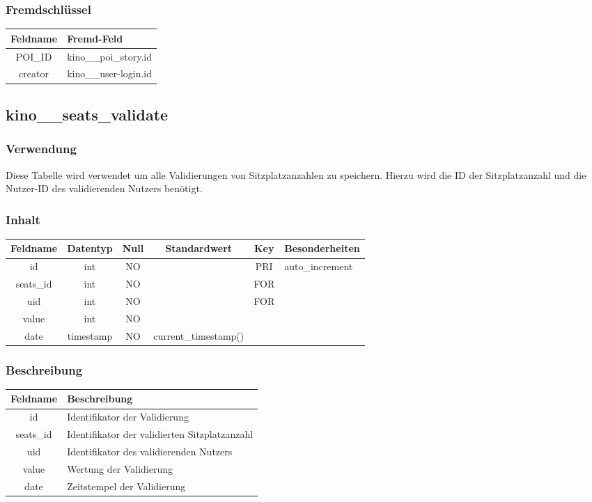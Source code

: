\subsubsection{Fremdschlüssel}
\begin{table}[H]
	\begin{tabular}{|c|p{12.5cm}|}
		\hline
		\textbf{Feldname} & \textbf{Fremd-Feld} \\ \hline
		POI\_ID & kino\_\_poi\_story.id \\ \hline
		creator & kino\_\_user-login.id \\ \hline
	\end{tabular}
\end{table}
\subsection{kino\_\_seats\_validate}
\subsubsection{Verwendung} Diese Tabelle wird verwendet um alle Validierungen von Sitzplatzanzahlen zu speichern. Hierzu wird die ID der Sitzplatzanzahl und die Nutzer-ID des validierenden Nutzers benötigt.
\subsubsection{Inhalt}
\begin{table}[H]
	\begin{tabular}{|c|c|c|c|c|p{3.5cm}|}
		\hline
		\textbf{Feldname} & \textbf{Datentyp} & \textbf{Null} & \textbf{Standardwert} & \textbf{Key}   & \textbf{Besonderheiten} \\ \hline
		id & int & NO &  & PRI & auto\_increment \\ \hline
		seats\_id & int & NO &  & FOR & \\ \hline
		uid & int & NO &  & FOR & \\ \hline
		value & int & NO &  &  & \\ \hline
		date & timestamp & NO & current\_timestamp() &  & \\ \hline
	\end{tabular}
\end{table}
\subsubsection{Beschreibung}
\begin{table}[H]
	\begin{tabular}{|c|p{12cm}|}
		\hline
		\textbf{Feldname} & \textbf{Beschreibung} \\ \hline
		id & Identifikator der Validierung \\ \hline
		seats\_id & Identifikator der validierten Sitzplatzanzahl \\ \hline
		uid & Identifikator des validierenden Nutzers \\ \hline
		value & Wertung der Validierung \\ \hline
		date & Zeitstempel der Validierung \\ \hline
	\end{tabular}
\end{table}
